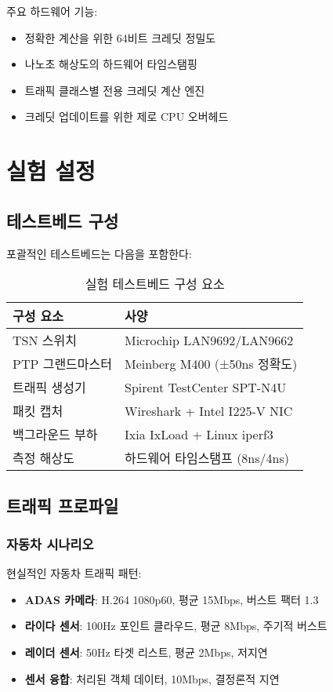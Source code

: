 \documentclass[twocolumn,10pt]{article}
\begin{document}
주요 하드웨어 기능:
\begin{itemize}
    \item 정확한 계산을 위한 64비트 크레딧 정밀도
    \item 나노초 해상도의 하드웨어 타임스탬핑
    \item 트래픽 클래스별 전용 크레딧 계산 엔진
    \item 크레딧 업데이트를 위한 제로 CPU 오버헤드
\end{itemize}

\section{실험 설정}

\subsection{테스트베드 구성}

포괄적인 테스트베드는 다음을 포함한다:

\begin{table}[h]
\centering
\caption{실험 테스트베드 구성 요소}
\label{tab:testbed}
\begin{tabular}{ll}
\toprule
\textbf{구성 요소} & \textbf{사양} \\
\midrule
TSN 스위치 & Microchip LAN9692/LAN9662 \\
PTP 그랜드마스터 & Meinberg M400 (±50ns 정확도) \\
트래픽 생성기 & Spirent TestCenter SPT-N4U \\
패킷 캡처 & Wireshark + Intel I225-V NIC \\
백그라운드 부하 & Ixia IxLoad + Linux iperf3 \\
측정 해상도 & 하드웨어 타임스탬프 (8ns/4ns) \\
\bottomrule
\end{tabular}
\end{table}

\subsection{트래픽 프로파일}

\subsubsection{자동차 시나리오}

현실적인 자동차 트래픽 패턴:
\begin{itemize}
    \item \textbf{ADAS 카메라}: H.264 1080p60, 평균 15Mbps, 버스트 팩터 1.3
    \item \textbf{라이다 센서}: 100Hz 포인트 클라우드, 평균 8Mbps, 주기적 버스트
    \item \textbf{레이더 센서}: 50Hz 타겟 리스트, 평균 2Mbps, 저지연
    \item \textbf{센서 융합}: 처리된 객체 데이터, 10Mbps, 결정론적 지연
\end{itemize}
\end{document}
